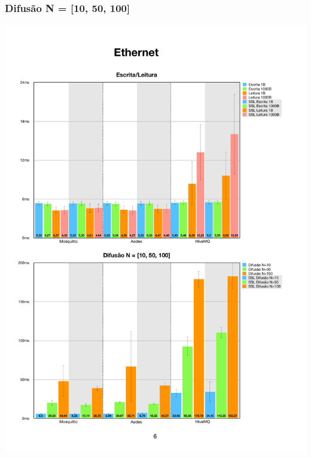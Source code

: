\documentclass[12pt,a4paper]{article}
\begin{document}
\subsubsection{Difusão N = [10, 50, 100]}
\begin{center}
\includegraphics[width=1.0\textwidth]{eth_spread1.pdf}
\end{center}
\end{document}
